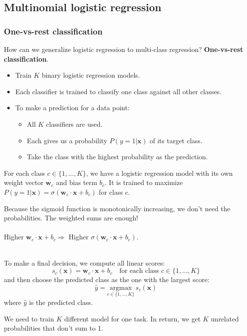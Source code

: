 \documentclass[11pt]{article}
\begin{document}
\subsection{Multinomial logistic regression}
\subsubsection{One-vs-rest classification}
How can we generalize logistic regression to multi-class regression? \textbf{One-vs-rest classification}.
\begin{itemize}
    \item Train $K$ binary logistic regression models.
    \item Each classifier is trained to classify one class against all other classes.
    \item To make a prediction for a data point:
    \begin{itemize}
        \item All $K$ classifiers are used.
        \item Each gives us a probability $P(y=1|\mathbf{x})$ of its target class.
        \item Take the class with the highest probability as the prediction.
    \end{itemize}
\end{itemize}
For each class $c\in\{1,\dots,K\}$, we have a logistic regression model with its own weight vector $\mathbf{w}_c$ and bias term $b_c$. It is trained to maximize $P(y=1|\mathbf{x})=\sigma(\mathbf{w}_c\cdot\mathbf{x}+b_c)$ for class $c$.
\begin{note}[Note]
Because the sigmoid function is monotonically increasing, we don't need the probabilities. The weighted sums are enough! \\\\
Higher $\mathbf{w}_c\cdot\mathbf{x}+b_c\Rightarrow$ Higher $\sigma(\mathbf{w}_c\cdot\mathbf{x}+b_c)$.
\end{note}
$\quad$\\[-1em]
To make a final decision, we compute all linear scores:
$$
s_c(\mathbf{x})=\mathbf{w}_c\cdot\mathbf{x}+b_c\quad\text{for each class }c\in\{1,\dots,K\}
$$
and then choose the predicted class as the one with the largest score:
$$
\hat{y}=\underset{c\in\{1,\dots,K\}}{\text{argmax}}\hspace{2pt}s_c(\mathbf{x})
$$
where $\hat{y}$ is the predicted class.
\begin{warning}[Disadvantages]
We need to train $K$ different model for one task. In return, we get $K$ unrelated probabilities that don't sum to 1.
\end{warning}
\end{document}
